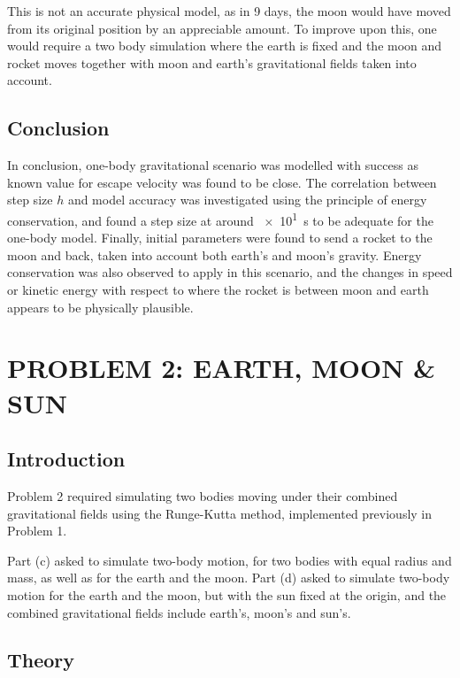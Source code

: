 \documentclass[hyphens,twocolumn,nobalancelastpage,aps,10pt,citeautoscript,longbibliography]{revtex4-2}
\begin{document}
This is not an accurate physical model, as in 9 days, the moon would have moved
from its original position by an appreciable amount. To improve upon this, one
would require a two body simulation where the earth is fixed and the moon and
rocket moves together with moon and earth's gravitational fields taken into
account.

\subsection{Conclusion}%
\label{sub:conclusion_1}

\noindent In conclusion, one-body gravitational scenario was modelled with
success as known value for escape velocity was found to be close. The
correlation between step size $h$ and model accuracy was investigated using the
principle of energy conservation, and found a step size at around
\qty{e1}{\second} to be adequate for the one-body model. Finally, initial
parameters were found to send a rocket to the moon and back, taken into account
both earth's and moon's gravity. Energy conservation was also observed to apply
in this scenario, and the changes in speed or kinetic energy with respect to
where the rocket is between moon and earth appears to be physically plausible.

\section{PROBLEM 2: EARTH, MOON \& SUN}%
\label{sec:problem_2_wave_equation}

\subsection{Introduction}%
\label{sub:introduction_2}

\noindent Problem 2 required simulating two bodies moving under their combined
gravitational fields using the Runge-Kutta method, implemented previously in
Problem 1.

Part (c) asked to simulate two-body motion, for two bodies with equal radius
and mass, as well as for the earth and the moon. Part (d) asked to simulate
two-body motion for the earth and the moon, but with the sun fixed at the
origin, and the combined gravitational fields include earth's, moon's and
sun's.

\subsection{Theory}%
\label{sub:theory_2}
\end{document}
